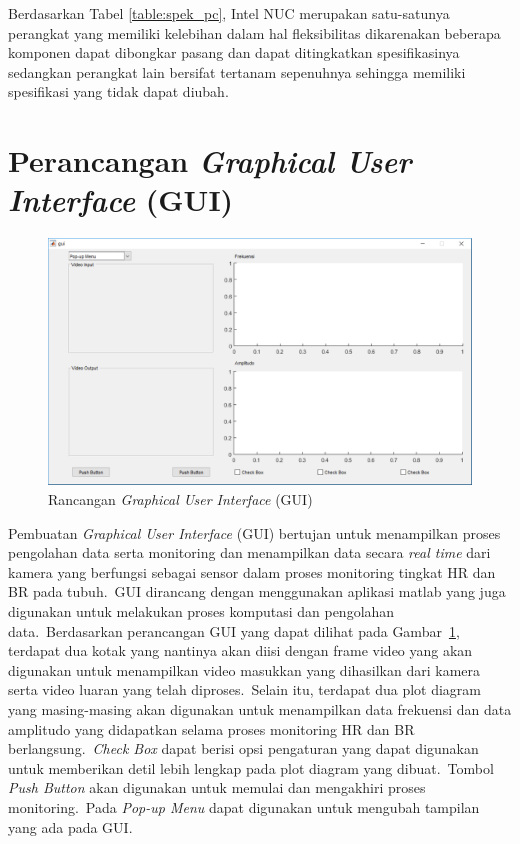 Berdasarkan Tabel  \ref{table:spek_pc}, Intel NUC merupakan satu-satunya perangkat yang memiliki kelebihan dalam hal fleksibilitas dikarenakan beberapa komponen dapat dibongkar pasang dan dapat ditingkatkan spesifikasinya sedangkan perangkat lain bersifat tertanam sepenuhnya sehingga memiliki spesifikasi yang tidak dapat diubah.

\newpage
\section{Perancangan \textit{Graphical User Interface} (GUI)}
\begin{figure}[ht]
	\centering
	\includegraphics[width=1.15\textwidth,height=0.8\linewidth,angle=-90]{gui}
	\caption{Rancangan \textit{Graphical User Interface} (GUI)}
	\label{fig:gui}   
\end{figure}

Pembuatan \textit{Graphical User Interface} (GUI) bertujan untuk menampilkan proses pengolahan data serta monitoring dan menampilkan data secara \textit{real time} dari kamera yang berfungsi sebagai sensor dalam proses monitoring tingkat HR dan BR pada tubuh.~GUI dirancang dengan menggunakan aplikasi matlab yang juga digunakan untuk melakukan proses komputasi dan pengolahan data.~Berdasarkan perancangan GUI yang dapat dilihat pada Gambar~\ref{fig:gui}, terdapat dua kotak yang nantinya akan diisi dengan frame video yang akan digunakan untuk menampilkan video masukkan yang dihasilkan dari kamera serta video luaran yang telah diproses.~Selain itu, terdapat dua plot diagram yang masing-masing akan digunakan untuk menampilkan data frekuensi dan data amplitudo yang didapatkan selama proses monitoring HR dan BR berlangsung.~\textit{Check Box} dapat berisi opsi pengaturan yang dapat digunakan untuk memberikan detil lebih lengkap pada plot diagram yang dibuat.~Tombol \textit{Push Button} akan digunakan untuk memulai dan mengakhiri proses monitoring.~Pada \textit{Pop-up Menu} dapat digunakan untuk mengubah tampilan yang ada pada GUI.

